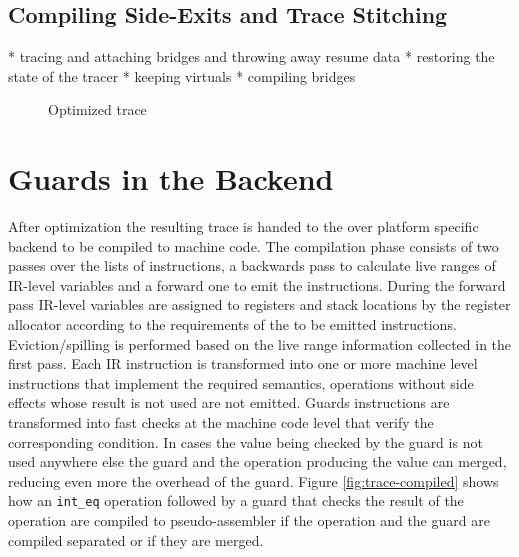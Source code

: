 \documentclass[10pt,preprint]{sigplanconf}
\begin{document}
\subsection{Compiling Side-Exits and Trace Stitching} %
\label{sub:Compiling side-exits and trace stitching}
   * tracing and attaching bridges and throwing away resume data
   * restoring the state of the tracer
     * keeping virtuals
   * compiling bridges


\begin{figure}
    
    \caption{Optimized trace}
    \label{fig:trace-log}
\end{figure}
\section{Guards in the Backend}
\label{sec:Guards in the Backend}

After optimization the resulting trace is handed to the over platform specific
backend to be compiled to machine code. The compilation phase consists of two
passes over the lists of instructions, a backwards pass to calculate live
ranges of IR-level variables and a forward one to emit the instructions. During
the forward pass IR-level variables are assigned to registers and stack
locations by the register allocator according to the requirements of the to be
emitted instructions.  Eviction/spilling is performed based on the live range
information collected in the first pass. Each IR instruction is transformed
into one or more machine level instructions that implement the required
semantics, operations without side effects whose result is not used are not
emitted. Guards instructions are transformed into fast checks at the machine
code level that verify the corresponding condition.  In cases the value being
checked by the guard is not used anywhere else the guard and the operation
producing the value can merged, reducing even more the overhead of the guard.
Figure \ref{fig:trace-compiled} shows how an \texttt{int\_eq} operation
followed by a guard that checks the result of the operation are compiled to
pseudo-assembler if the operation and the guard are compiled separated or if
they are merged.
\end{document}
